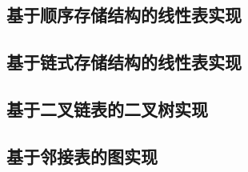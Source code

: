 \documentclass[supercite]{Experimental_Report}
\theoremstyle{definition}
\begin{document}
\subsection{基于顺序存储结构的线性表实现}

\subsection{基于链式存储结构的线性表实现}

\subsection{基于二叉链表的二叉树实现}

\subsection{基于邻接表的图实现}

\newpage

\nocite{*} %



\setcounter{secnumdepth}{0}
\appendix

	
\newpage
	
\newpage
	
\newpage
	
\end{document}
